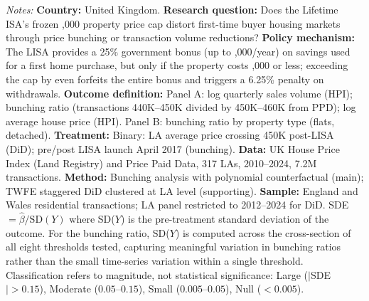 \begin{table}[t]
\begin{threeparttable}
\begin{tablenotes}[flushleft]
\item \textit{Notes:} \textbf{Country:} United Kingdom. \textbf{Research question:} Does the Lifetime ISA's frozen ,000 property price cap distort first-time buyer housing markets through price bunching or transaction volume reductions? \textbf{Policy mechanism:} The LISA provides a 25\% government bonus (up to ,000/year) on savings used for a first home purchase, but only if the property costs ,000 or less; exceeding the cap by even  forfeits the entire bonus and triggers a 6.25\% penalty on withdrawals. \textbf{Outcome definition:} Panel A: log quarterly sales volume (HPI); bunching ratio (transactions \textsterling440K--450K divided by \textsterling450K--460K from PPD); log average house price (HPI). Panel B: bunching ratio by property type (flats, detached). \textbf{Treatment:} Binary: LA average price crossing \textsterling450K post-LISA (DiD); pre/post LISA launch April 2017 (bunching). \textbf{Data:} UK House Price Index (Land Registry) and Price Paid Data, 317 LAs, 2010--2024, 7.2M transactions. \textbf{Method:} Bunching analysis with polynomial counterfactual (main); TWFE staggered DiD clustered at LA level (supporting). \textbf{Sample:} England and Wales residential transactions; LA panel restricted to 2012--2024 for DiD. SDE $= \hat{\beta} / \text{SD}(Y)$ where SD($Y$) is the pre-treatment standard deviation of the outcome. For the bunching ratio, SD($Y$) is computed across the cross-section of all eight thresholds tested, capturing meaningful variation in bunching ratios rather than the small time-series variation within a single threshold. Classification refers to magnitude, not statistical significance: Large ($|$SDE$| > 0.15$), Moderate ($0.05$--$0.15$), Small ($0.005$--$0.05$), Null ($< 0.005$).
\end{tablenotes}
\end{threeparttable}
\end{table}
